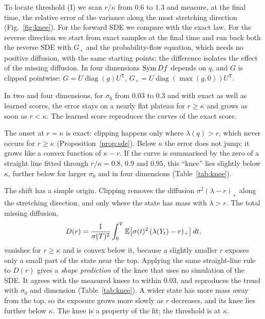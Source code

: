 To locate threshold (I) we scan $r/\kappa$ from $0.6$ to $1.3$ and measure, at the final time, the relative error of the variance along the most stretching direction (Fig.~\ref{fig:knee}). For the forward SDE we compare with the exact law. For the reverse direction we start from exact samples at the final time and run back both the reverse SDE with $G_+$ and the probability-flow equation, which needs no positive diffusion, with the same starting points; the difference isolates the effect of the missing diffusion. In four dimensions $\operatorname{Sym} Df$ depends on $q$, and $G$ is clipped pointwise: $G = U\operatorname{diag}(g)U^{\mathsf T}$, $G_+ = U\operatorname{diag}(\max(g,0))U^{\mathsf T}$.

\begin{observation}
\label{obs:knee}
In two and four dimensions, for $\sigma_0$ from $0.03$ to $0.3$ and with exact as well as learned scores, the error stays on a nearly flat plateau for $r \geq \kappa$ and grows as soon as $r < \kappa$. The learned score reproduces the curves of the exact score.
\end{observation}

The onset at $r = \kappa$ is exact: clipping happens only where $\lambda(q) > r$, which never occurs for $r \geq \kappa$ (Proposition~\ref{prop:sde}). Below $\kappa$ the error does not jump; it grows like a convex function of $\kappa - r$. If the curve is summarised by the zero of a straight line fitted through $r/\kappa = 0.8$, $0.9$ and $0.95$, this ``knee'' lies slightly below $\kappa$, further below for larger $\sigma_0$ and in four dimensions (Table~\ref{tab:knee}).

The shift has a simple origin. Clipping removes the diffusion $\sigma^2(\lambda - r)_+$ along the stretching direction, and only where the state has mass with $\lambda > r$. The total missing diffusion,
\begin{equation}
D(r) = \frac{1}{\sigma(T)^2}\int_0^T \mathbb{E}\big[\sigma(t)^2\,(\lambda(Y_t) - r)_+\big]\,dt ,
\label{eq:missing}
\end{equation}
vanishes for $r \geq \kappa$ and is convex below it, because a slightly smaller $r$ exposes only a small part of the state near the top. Applying the same straight-line rule to $D(r)$ gives a \emph{shape prediction} of the knee that uses no simulation of the SDE. It agrees with the measured knees to within $0.03$, and reproduces the trend with $\sigma_0$ and dimension (Table~\ref{tab:knee}). A wider state has more mass away from the top, so its exposure grows more slowly as $r$ decreases, and its knee lies further below $\kappa$. The knee is a property of the fit; the threshold is at $\kappa$.

